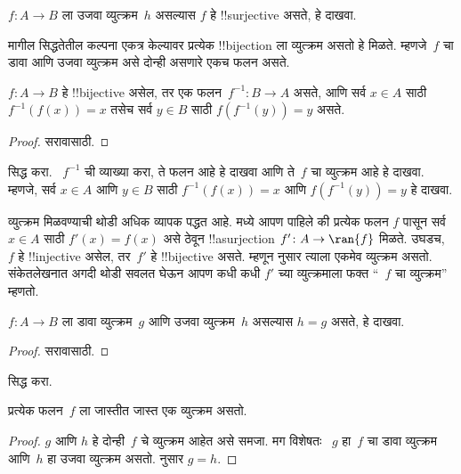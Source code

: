 \documentclass[../../../include/open-logic-section]{subfiles}
\begin{document}
\begin{prob}
$f\colon A \to B$ ला उजवा व्युत्क्रम~$h$ असल्यास $f$ हे
!!{surjective} असते, हे दाखवा.
\end{prob}

\begin{explain}
  मागील सिद्धतेतील कल्पना एकत्र केल्यावर प्रत्येक !!{bijection} ला
  व्युत्क्रम असतो हे मिळते. म्हणजे~$f$ चा डावा आणि उजवा व्युत्क्रम
  असे दोन्ही असणारे एकच फलन असते.
\end{explain}

\begin{prop}
$f\colon A \to B$ हे !!{bijective} असेल, तर एक
फलन~$f^{-1}\colon B \to A$ असते, आणि सर्व $x \in A$ साठी
$f^{-1}(f(x)) = x$ तसेच सर्व $y \in B$ साठी $f(f^{-1}(y)) = y$ असते.
\end{prop}

\begin{proof}
सरावासाठी.
\end{proof}

\begin{prob}
 सिद्ध करा. ~$f^{-1}$ ची
व्याख्या करा, ते फलन आहे हे दाखवा आणि ते~$f$ चा व्युत्क्रम आहे हे
दाखवा. म्हणजे, सर्व $x \in A$ आणि $y \in B$ साठी
$f^{-1}(f(x)) = x$ आणि $f(f^{-1}(y)) = y$ हे दाखवा.
\end{prob}

\begin{explain}
व्युत्क्रम मिळवण्याची थोडी अधिक व्यापक पद्धत आहे. 
मध्ये आपण पाहिले की प्रत्येक फलन $f$ पासून सर्व $x \in A$ साठी
$f'(x) = f(x)$ असे ठेवून !!a{surjection} $f' \colon A \to \ran{f}$
मिळते. उघडच, ~$f$ हे !!{injective} असेल, तर~$f'$ हे !!{bijective}
असते. म्हणून  नुसार त्याला एकमेव
व्युत्क्रम असतो. संकेतलेखनात अगदी थोडी सवलत घेऊन आपण कधी कधी
$f'$ च्या व्युत्क्रमाला फक्त ``~$f$ चा व्युत्क्रम'' म्हणतो.
\end{explain}

\begin{prop}%
  $f\colon A \to B$ ला डावा व्युत्क्रम~$g$ आणि उजवा व्युत्क्रम~$h$
  असल्यास $h = g$ असते, हे दाखवा.
\end{prop}

\begin{proof}
  सरावासाठी.
\end{proof}

\begin{prob}
   सिद्ध करा.
\end{prob}

\begin{prop}
प्रत्येक फलन~$f$ ला जास्तीत जास्त एक व्युत्क्रम असतो.
\end{prop}

\begin{proof}
  $g$ आणि $h$ हे दोन्ही~$f$ चे व्युत्क्रम आहेत असे समजा. मग विशेषतः
  ~$g$ हा~$f$ चा डावा व्युत्क्रम आणि~$h$ हा उजवा व्युत्क्रम असतो.
   नुसार $g = h$.
\end{proof}
\end{document}
